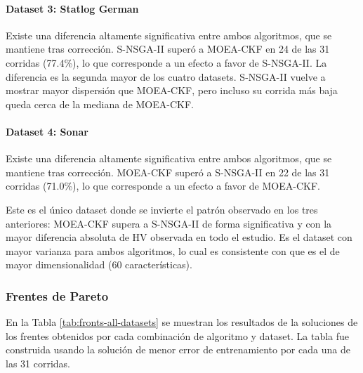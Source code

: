 \paragraph{Dataset 3: Statlog German}\label{sec:ds3}\label{sec:ds3-hv}
Existe una diferencia altamente significativa entre ambos algoritmos, que se mantiene tras corrección. S-NSGA-II superó a MOEA-CKF en 24 de las 31 corridas (77.4\%), lo que corresponde a un efecto a favor de S-NSGA-II. La diferencia es la segunda mayor de los cuatro datasets. S-NSGA-II vuelve a mostrar mayor dispersión que MOEA-CKF, pero incluso su corrida más baja queda cerca de la mediana de MOEA-CKF.

\paragraph{Dataset 4: Sonar}\label{sec:ds4}\label{sec:ds4-hv}
Existe una diferencia altamente significativa entre ambos algoritmos, que se mantiene tras corrección. MOEA-CKF superó a S-NSGA-II en 22 de las 31 corridas (71.0\%), lo que corresponde a un efecto a favor de MOEA-CKF.

Este es el único dataset donde se invierte el patrón observado en los tres anteriores: MOEA-CKF supera a S-NSGA-II de forma significativa y con la mayor diferencia absoluta de HV observada en todo el estudio. Es el dataset con mayor varianza para ambos algoritmos, lo cual es consistente con que es el de mayor dimensionalidad (60 características).

\subsubsection{Frentes de Pareto}
\label{sec:fronts}

En la Tabla \ref{tab:fronts-all-datasets} se muestran los resultados de la soluciones de los frentes obtenidos por cada combinación de algoritmo y dataset. La tabla fue construida usando la solución de menor error de entrenamiento por cada una de las 31 corridas.

